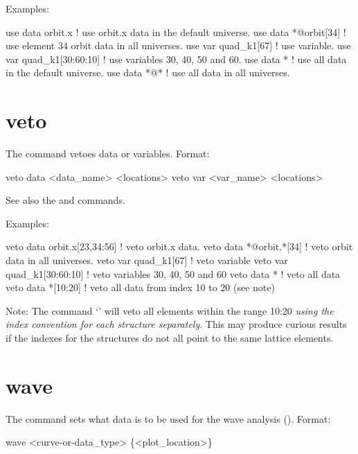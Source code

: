 {{{{{{{{{{{Examples:
\begin{example}
  use data orbit.x             ! use orbit.x data in the default universe.
  use data *@orbit[34]         ! use element 34 orbit data in all universes.
  use var quad_k1[67]          ! use variable.
  use var quad_k1[30:60:10]    ! use variables 30, 40, 50 and 60.
  use data *                   ! use all data in the default universe.
  use data *@*                 ! use all data in all universes.
\end{example}


\section{veto}
\label{s:veto}

The  command vetoes data or variables. Format:
\begin{example}
  veto data <data_name> <locations>
  veto var <var_name> <locations>
\end{example}

\vskip 7pt 

See also the  and  commands.

Examples:
\begin{example}
  veto data orbit.x[23,34:56]  ! veto orbit.x data.
  veto data *@orbit.*[34]      ! veto orbit data in all universes.
  veto var quad_k1[67]         ! veto variable
  veto var quad_k1[30:60:10]   ! veto variables 30, 40, 50 and 60
  veto data *                  ! veto all data
  veto data *[10:20]           ! veto all data from index 10 to 20 (see note)
\end{example}

Note: The command `' will veto all  elements within the range
10:20 \textit{using the index convention for each  structure separately}. This may produce
curious results if the indexes for the  structures do not all point to the same lattice
elements.


\section{wave}
\label{s:wave}

The  command sets what data is to be used for the wave analysis (). 
Format:
\begin{example}
  wave <curve-or-data_type> \{<plot_location>\}
\end{example}

}}}}}}}}}}}

